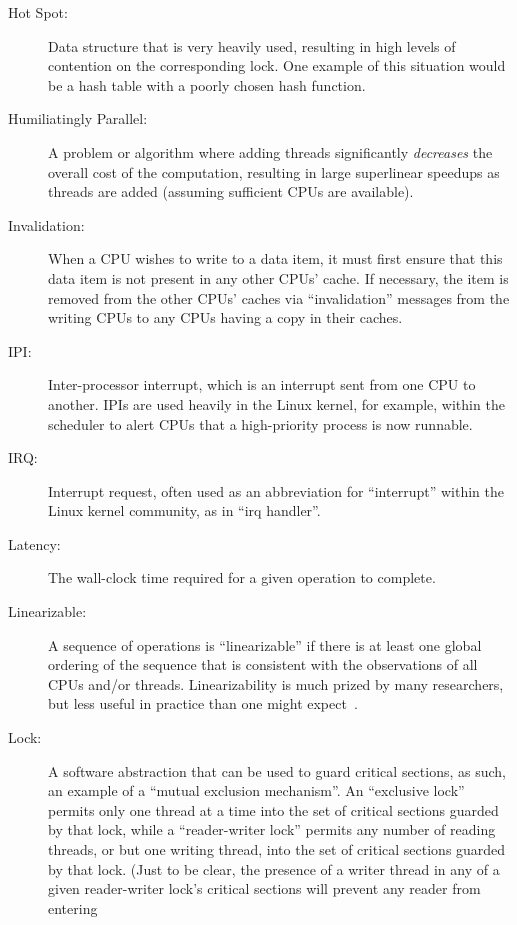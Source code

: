 \begin{description}
\fi

\item[Hot Spot:]
	Data structure that is very heavily used, resulting in high
	levels of contention on the corresponding lock.
	One example of this situation would be a hash table with
	a poorly chosen hash function.
\item[Humiliatingly Parallel:]
	A problem or algorithm where adding threads significantly
	\emph{decreases} the overall cost of the computation, resulting in
	large superlinear speedups as threads are added (assuming sufficient
	CPUs are available).
\item[Invalidation:]
	When a CPU wishes to write to a data item, it must first ensure
	that this data item is not present in any other CPUs' cache.
	If necessary, the item is removed from the other CPUs' caches
	via ``invalidation'' messages from the writing CPUs to any
	CPUs having a copy in their caches.
\item[IPI:]
	Inter-processor interrupt, which is an
	interrupt sent from one CPU to another.
	IPIs are used heavily in the Linux kernel, for example, within
	the scheduler to alert CPUs that a high-priority process is now
	runnable.
\item[IRQ:]
	Interrupt request, often used as an abbreviation for ``interrupt''
	within the Linux kernel community, as in ``irq handler''.
\item[Latency:]
	The wall-clock time required for a given operation to complete.
\item[Linearizable:]
	A sequence of operations is ``linearizable'' if there is at
	least one global ordering of the sequence that is consistent
	with the observations of all CPUs and/or threads.
	Linearizability is much prized by many researchers, but less
	useful in practice than one might
	expect~\cite{AndreasHaas2012FIFOisnt}.
\item[Lock:]
	A software abstraction that can be used to guard critical sections,
	as such, an example of a ``mutual exclusion mechanism''.
	An ``exclusive lock'' permits only one thread at a time into the
	set of critical sections guarded by that lock, while a
	``reader-writer lock'' permits any number of reading
	threads, or but one writing thread, into the set of critical
	sections guarded by that lock.  (Just to be clear, the presence
	of a writer thread in any of a given reader-writer lock's
	critical sections will prevent any reader from entering

\end{description}
